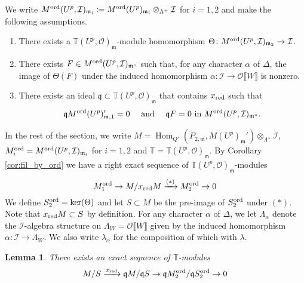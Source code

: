 \documentclass[leqno]{amsart}
\newtheorem{lem}[thm]{Lemma}
\theoremstyle{definition}
\theoremstyle{remark}
\newcommand{\oo}{\mathcal{O}}
\DeclareMathOperator{\Hom}{Hom}
\newcommand{\fm}{\mathfrak{m}}
\newcommand{\fq}{\mathfrak{q}}
\newcommand{\xx}{x_\textnormal{red}}
\newcommand{\TT}{\mathbb{T}} %
\newcommand{\I}{\mathcal{I}} %
\newcommand{\ord}{\textnormal{ord}} %
\begin{document}
We write
$M^{\ord}(U^p,\I)_{\fm_i}\coloneqq
M^{\ord}(U^p)_{\fm_i}\otimes_{\Lambda^+}\I$ for $i=1,2$
and make the following assumptions.
\begin{enumerate}[label=(C\arabic*)]
\item There exists a $\TT(U^p,\oo)_\fm$-module 
homomorphism
$\Theta\colon M^{\ord}(U^p,\I)_{\fm_2}\to \I$.
\label{cond:C1}
\item There exists $F\in M^{\ord}(U^p,\I)_{\fm^\circ}$
such that,
for any character $\alpha$ of $\Delta$,
the image of $\Theta(F)$ under the induced homomorphism
$\alpha\colon\I\to\oo\llbracket W\rrbracket$ is nonzero.
\label{cond:C3}
\item There exists an ideal 
$\fq\subset \TT(U^p,\oo)_{\fm}$
that contains $\xx$ such that
\[
    \fq M^{\ord}(U^p)_{\fm,1}'=0\quad
    \text{ and }\quad
    \fq F=0 \text{ in } M^{\ord}(U^p,\I)_{\fm^{\circ}}.
\]
\label{cond:C2}

\end{enumerate}

In the rest of the section, we write
$M=\Hom_{Q'}(\tilde{P}_{2,\fm},M(U^p)_{\fm}')
\otimes_{\Lambda^+}\I$,
$M_i^{\ord}=M^{\ord}(U^p,\I)_{\fm_i}$ for $i=1,2$ and
$\TT=\TT(U^p,\oo)_{\fm}$.
By Corollary \ref{cor:fil_by_ord}
we have a right exact sequence of $\TT(U^p,\oo)_\fm$-modules
\begin{equation}\label{eq:chain_coh}
    M_1^{\ord}\to M/\xx M\xrightarrow{(*)} M_2^{\ord}\to 0
\end{equation}
We define $S_2^{\ord}=\ker(\Theta)$ and let $S\subset M$
be the pre-image of $S_2^{\ord}$ under $(*)$.
Note that $\xx M\subset S$ by definition.
For any character $\alpha$ of $\Delta$,
we let $\Lambda_\alpha$ denote the $\I$-algebra structure
on $\Lambda_W=\oo\llbracket W\rrbracket$ given by 
the induced homomorphism $\alpha\colon\I\to \Lambda_W$.
We also write $\lambda_\alpha$
for the composition of which with $\lambda$.


\begin{lem}\label{lem:right_exact}
There exists an exact sequence
of $\TT$-modules
\begin{equation}\label{eq:fund}
	M/S\xrightarrow{\xx} \fq M/\fq S\to 
	\fq M_2^\ord/\fq S_2^\ord \to 0
\end{equation}
\end{lem}
\end{document}
